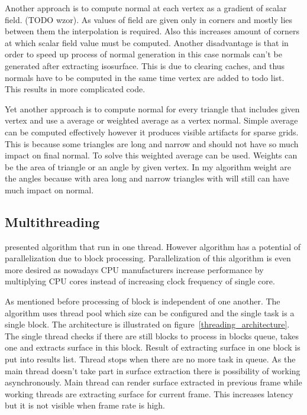 Another approach is to compute normal at each vertex as a gradient of scalar field. (TODO wzor). As values of field are given only in corners and mostly lies between them the interpolation is required. Also this increases amount of corners at which scalar field value must be computed. Another disadvantage is that in order to speed up process of normal generation in this case normals can't be generated after extracting isosurface. This is due to clearing caches, and thus normals have to be computed in the same time vertex are added to todo list. This results in more complicated code.


Yet another approach is to compute normal for every triangle that includes given vertex and use a average or weighted average as a vertex normal. Simple average can be computed effectively however it produces visible artifacts for sparse grids. This is because some triangles are long and narrow and should not have so much impact on final normal. To solve this weighted average can be used. Weights can be the area of triangle or an angle by given vertex. In my algorithm weight are the angles because with area long and narrow triangles with will still can have much impact on normal. 

\subsection{Multithreading}
\cite{RosenbergBirdwell2008} presented algorithm that run in one thread. However algorithm has a potential of parallelization due to block processing. Parallelization of this algorithm is even more desired as nowadays CPU manufacturers increase performance by multiplying CPU cores instead of increasing clock frequency of single core. 

As mentioned before processing of block is independent of one another. The algorithm uses thread pool which size can be configured and the single task is a single block. The architecture is illustrated on figure~\ref{threading_architecture}. The single thread checks if there are still blocks to process in blocks queue, takes one and extracts surface in this block. Result of extracting surface in one block is put into results list. Thread stops when there are no more task in queue. As the main thread doesn't take part in surface extraction there is possibility of working asynchronously. Main thread can render surface extracted in previous frame while working threads are extracting surface for current frame. This increases latency but it is not visible when frame rate is high. 


